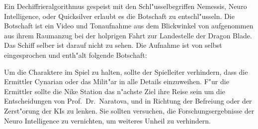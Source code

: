 Ein Dechiffrieralgorithmus gespeist mit den Schl"usselbegriffen Nemessis, Neuro Intelligence, \xl{} oder Quicksilver erlaubt es die Botschaft zu entschl"usseln. Die Botschaft ist ein Video und Tonaufnahme aus dem Blickwinkel von \ml{} aufgenommen aus ihrem Raumanzug bei der holprigen Fahrt zur Landestelle der Dragon Blade. Das Schiff selber ist darauf nicht zu sehen. Die Aufnahme ist von \ml{} selbst eingesprochen und enth"alt folgende Botschaft:


\begin{remarks}
	Um die Charaktere im Spiel zu halten, sollte der Spielleiter verhindern, dass die Ermittler Cynarian oder das Milit"ar in alle Details einzuweihen. F"ur die Ermittler sollte die Nike Station das n"achste Ziel ihre Reise sein um die Entscheidungen von Prof.~Dr.~Naratova, \ml{} und \xl{} in Richtung der Befreiung oder der Zerst"orung der KIs zu lenken. Sie sollten versuchen, die Forschungsergebnisse der Neuro Intelligence zu vernichten, um weiteres Unheil zu verhindern.
\end{remarks}
